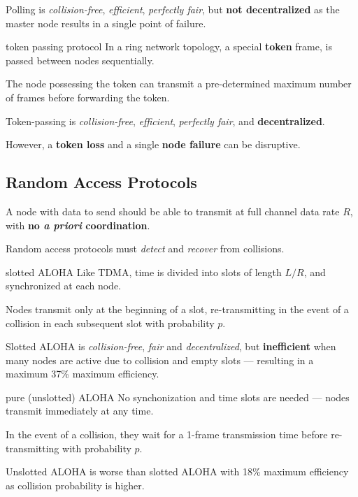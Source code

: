 Polling is \textit{collision-free}, \textit{efficient}, \textit{perfectly fair},
but \textbf{not decentralized} as the master node results in a single point of failure.

\begin{defn}{token passing protocol}
    In a ring network topology, a special \textbf{token} frame, is passed between
    nodes sequentially.

    The node possessing the token can transmit a pre-determined maximum number of frames
    before forwarding the token.
\end{defn}

Token-passing is \textit{collision-free}, \textit{efficient}, \textit{perfectly fair}, and \textbf{decentralized}.

However, a \textbf{token loss} and a single \textbf{node failure} can be disruptive.

\subsection{Random Access Protocols}
A node with data to send should be able to transmit at full channel data rate $R$,
with \textbf{no \textit{a priori} coordination}.

Random access protocols must \textit{detect} and \textit{recover} from collisions.

\begin{defn}{slotted ALOHA}
    Like TDMA, time is divided into slots of length $L / R$, and synchronized at each node.

    Nodes transmit only at the beginning of a slot, re-transmitting in the event of a collision
    in each subsequent slot with probability $p$.
\end{defn}

Slotted ALOHA is \textit{collision-free}, \textit{fair} and \textit{decentralized},
but \textbf{inefficient} when many nodes are active due to collision and empty slots ---
resulting in a maximum 37\% maximum efficiency.

\begin{defn}{pure (unslotted) ALOHA}
    No synchonization and time slots are needed --- nodes transmit immediately at any time.

    In the event of a collision, they wait for a 1-frame transmission time 
    before re-transmitting with probability $p$.
\end{defn}

Unslotted ALOHA is worse than slotted ALOHA with 18\% maximum efficiency as collision probability
is higher.

